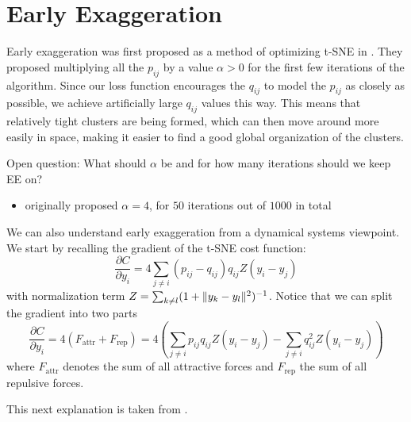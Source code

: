 \section{Early Exaggeration}
Early exaggeration was first proposed as a method of optimizing t-SNE in \cite{vdMaa08}. They proposed multiplying all the $p_{ij}$ by a value $\alpha > 0$ for the first few iterations of the algorithm. Since our loss function encourages the $q_{ij}$ to model the $p_{ij}$ as closely as possible, we achieve artificially large $q_{ij}$ values this way. This means that relatively tight clusters are being formed, which can then move around more easily in space, making it easier to find a good global organization of the clusters. 

Open question: What should $\alpha$ be and for how many iterations should we keep EE on? 
\begin{itemize}
    \item \cite{vdMaa08} originally proposed $\alpha = 4$, for $50$ iterations out of $1000$ in total 
\end{itemize}

We can also understand early exaggeration from a dynamical systems viewpoint. 
We start by recalling the gradient of the t-SNE cost function: 
\begin{equation}
    \frac{\partial C}{\partial y_i} = 4 \sum_{j \neq i} (p_{ij} - q_{ij}) q_{ij} Z (y_i - y_j)
\end{equation}
with normalization term $Z = \sum_{k \neq l} (1+ \lVert y_k - y_l\rVert^2 )^{-1}$. Notice that we can split the gradient into two parts 
\begin{equation}
    \frac{\partial C}{\partial y_i} = 4 (F_{\text{attr}} + F_{\text{rep}}) = 4 \left( \sum_{j \neq i } p_{ij} q_{ij} Z (y_i - y_j) - \sum_{j \neq i} q_{ij}^2 Z (y_i - y_j) \right) 
\end{equation}
where $F_{\text{attr}}$ denotes the sum of all attractive forces and $F_{\text{rep}}$ the sum of all repulsive forces. 

This next explanation is taken from \cite{LinStei22}.

